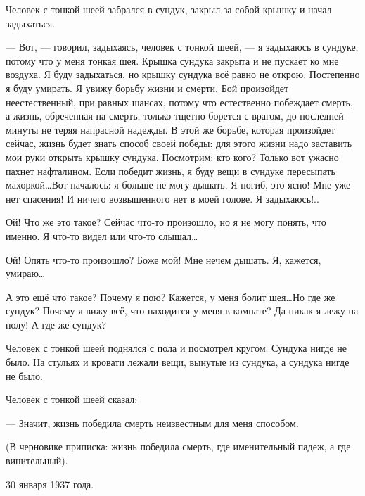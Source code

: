 Человек с тонкой шеей забрался в сундук, закрыл за собой крышку и начал задыхаться.
 
--- Вот, --- говорил, задыхаясь, человек с тонкой шеей, --- я задыхаюсь в сундуке, потому что у меня тонкая шея. Крышка сундука закрыта и не пускает ко мне воздуха. Я буду задыхаться, но крышку сундука всё равно не открою. Постепенно я буду умирать. Я увижу борьбу жизни и смерти. Бой произойдет неестественный, при равных шансах, потому что естественно побеждает смерть, а жизнь, обреченная на смерть, только тщетно борется с врагом, до последней минуты не теряя напрасной надежды. В этой же борьбе, которая произойдет сейчас, жизнь будет знать способ своей победы: для этого жизни надо заставить мои руки открыть крышку сундука. Посмотрим: кто кого? Только вот ужасно пахнет нафталином. Если победит жизнь, я буду вещи в сундуке пересыпать махоркой\dots\space Вот началось: я больше не могу дышать. Я погиб, это ясно! Мне уже нет спасения! И ничего возвышенного нет в моей голове. Я задыхаюсь!..
 
Ой! Что же это такое? Сейчас что-то произошло, но я не могу понять, что именно. Я что-то видел или что-то слышал\dots
 
Ой! Опять что-то произошло? Боже мой! Мне нечем дышать. Я, кажется, умираю\dots
 
А это ещё что такое? Почему я пою? Кажется, у меня болит шея\dots\space Но где же сундук? Почему я вижу всё, что находится у меня в комнате? Да никак я лежу на полу! А где же сундук?
 
Человек с тонкой шеей поднялся с пола и посмотрел кругом. Сундука нигде не было. На стульях и кровати лежали вещи, вынутые из сундука, а сундука нигде не было.
 
Человек с тонкой шеей сказал:
 
--- Значит, жизнь победила смерть неизвестным для меня способом.
 
(В черновике приписка: жизнь победила смерть, где именительный падеж, а где винительный).
 
\begin{flushright}
30 января 1937 года.
\end{flushright}